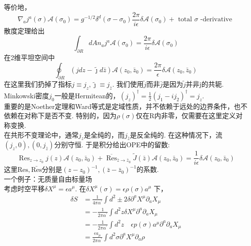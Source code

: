 等价地，
\begin{equation}
\nabla_{a} j^{a}(\sigma) \mathscr{A}\left(\sigma_{0}\right)=g^{-1 / 2} \delta^{d}\left(\sigma-\sigma_{0}\right) \frac{2 \pi}{i \epsilon} \delta \mathscr{A}\left(\sigma_{0}\right)+\text { total } \sigma \text { -derivative }
\end{equation}
散度定理给出
\begin{equation}
\int_{\partial R} d A n_{a} j^{a} \mathscr{A}\left(\sigma_{0}\right)=\frac{2 \pi}{i \epsilon} \delta \mathscr{A}\left(\sigma_{0}\right)
\end{equation}
在2维平坦空间中
\begin{equation}
\oint_{\partial R}(j d z-\tilde{\jmath} d \bar{z}) \mathscr{A}\left(z_{0}, \bar{z}_{0}\right)=\frac{2 \pi}{\epsilon} \delta \mathscr{A}\left(z_{0}, \bar{z}_{0}\right)
\end{equation}
在这里我们扔掉了指标$j \equiv j_{z}, \tilde{\jmath} \equiv j_{\bar{z}}$. 我们使用$\tilde{j}$而非$\bar{j}$是因为$\tilde{j}$并非j的共轭. Minkowski密度$j_0$一般是Hermitean的，$\left(j_{z}\right)^{\dagger}=\frac{1}{2}\left(j_{1}-i j_{2}\right)^{\dagger}=j_{z}$.\\
重要的是Noether定理和Ward等式是定域性质，并不依赖于远处的边界条件，也不依赖在对称下是否不变. 特别的，因为$\rho(\sigma)$仅在R内非零，仅需要在这里定义对称变换.\\
在共形不变理论中，通常$j_z$是全纯的，而$j_{\bar{z}}$是反全纯的. 在这种情况下，流$(j_z,0),(0,j_{\bar{z}})$分别守恒. 于是积分给出OPE中的留数:
\begin{equation}\label{2.3.11}
\operatorname{Res}_{z \rightarrow z_{0}} j(z) \mathscr{A}\left(z_{0}, \bar{z}_{0}\right)+\overline{\operatorname{Res}}_{\bar{z} \rightarrow \bar{z}_{0}} \tilde{J}(\bar{z}) \mathscr{A}\left(z_{0}, \bar{z}_{0}\right)=\frac{1}{i \epsilon} \delta \mathscr{A}\left(z_{0}, \bar{z}_{0}\right)
\end{equation}
这里$\mathrm{Res},\mathrm{\bar{Res}}$分别是$\left(z-z_{0}\right)^{-1}, \left(\bar{z}-\bar{z}_{0}\right)^{-1}$的系数.\\
一个例子：无质量自由标量场\\
考虑时空平移$\delta X^{\mu}=\epsilon a^{\mu}$. 在$\delta X^{\mu}(\sigma)=\epsilon \rho(\sigma) a^{\mu}$ 下，
\begin{equation}
\begin{aligned}
\delta S&=\frac{1}{4 \pi \alpha^{\prime}} \int d^{2} \pm 2 \delta \partial^{a} X^{\mu} \partial_{a} X_{\mu}\\
&=-\frac{1}{2\pi \alpha^{\prime}} \int d^{2} z \delta X^{\mu} \partial^{a} \partial_{a} X_{\mu} \\
&=-\frac{1}{2 \pi \alpha^{\prime}} \int d^{2} z \quad \epsilon p(\sigma) a^{\mu} \partial^{a} \partial_{a} X_{\mu}\\
&=\frac{\epsilon a_{\mu}}{2 \pi \alpha^{\prime}} \int d^{2} \sigma \partial^{a} X^{\mu} \partial_{a} \rho
\end{aligned}
\end{equation}
